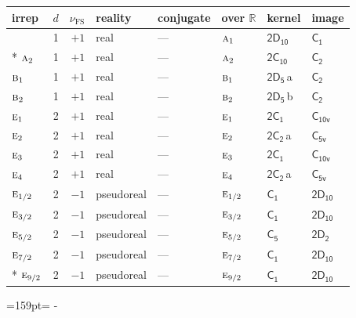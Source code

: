 \documentclass[10pt,a4paper]{article}
\makeatletter
\def\grouprule#1#2{\noalign{\marks\LTgroupmarks{\the\belowrulesep}\nobreak\vskip#1%
  \vskip\aboverulesep}\multispan\LT@cols\unskip{\leaders\hrule\@height#2\hfill\kern\z@}\cr
  \noalign{\penalty\LTrulebreak\vskip\belowrulesep\global\@lastruleclass\z@}}
\newcommand{\needspace}[1]{\par\penalty-100\begingroup\dimen0=#1\relax\dimen2=\pagegoal
  \advance\dimen2-\pagetotal\ifdim\dimen0>\dimen2\relax\ifdim\dimen2>0pt\vfil\break\fi\fi
  \endgroup}
\numberwithin{equation}{section}
\newcommand{\grp}[1]{\mathsf{#1}}
\newcommand{\irr}[1]{\text{\normalfont\scshape #1}}
\newcommand{\detbox}[1]{{\setlength{\fboxsep}{1pt}\fbox{#1}}}
\newcommand{\clsletter}[1]{\,{\scriptsize\color{black!55}#1}}
\newcommand{\fsind}{\nu_{\mathrm{FS}}}
\makeatother
\begin{document}
\setlength{\emergencystretch}{2em}\par\setlength{\emergencystretch}{0pt}
{\small\renewcommand{\arraystretch}{1.25}\setlength{\tabcolsep}{4pt}\begin{longtable}{@{}lrrlllll@{}}\toprule
irrep & $d$ & $\fsind$ & reality & conjugate & over $\mathbb{R}$ & kernel & image\\\midrule\endhead
\bottomrule\endfoot\endlastfoot
\detbox{$\irr{a}_{1}$} & 1 & $+1$ & real & --- & $\irr{a}_{1}$ & \href{2D10.pdf}{$\grp{2D_{10}}$} & \href{../../../rotation/data/pdf/C1.pdf}{$\grp{C_{1}}$}\\*
$\irr{a}_{2}$ & 1 & $+1$ & real & --- & $\irr{a}_{2}$ & \href{2C10.pdf}{$\grp{2C_{10}}$} & \href{../../../rotation/data/pdf/C2.pdf}{$\grp{C_{2}}$}\\
$\irr{b}_{1}$ & 1 & $+1$ & real & --- & $\irr{b}_{1}$ & \href{2D5.pdf}{$\grp{2D_{5}}$}\clsletter{a} & \href{../../../rotation/data/pdf/C2.pdf}{$\grp{C_{2}}$}\\
$\irr{b}_{2}$ & 1 & $+1$ & real & --- & $\irr{b}_{2}$ & \href{2D5.pdf}{$\grp{2D_{5}}$}\clsletter{b} & \href{../../../rotation/data/pdf/C2.pdf}{$\grp{C_{2}}$}\\
$\irr{e}_{1}$ & 2 & $+1$ & real & --- & $\irr{e}_{1}$ & \href{2C1.pdf}{$\grp{2C_{1}}$} & \href{../../../rotation/data/pdf/C10v.pdf}{$\grp{C_{10v}}$}\\
$\irr{e}_{2}$ & 2 & $+1$ & real & --- & $\irr{e}_{2}$ & \href{2C2.pdf}{$\grp{2C_{2}}$}\clsletter{a} & \href{../../../rotation/data/pdf/C5v.pdf}{$\grp{C_{5v}}$}\\
$\irr{e}_{3}$ & 2 & $+1$ & real & --- & $\irr{e}_{3}$ & \href{2C1.pdf}{$\grp{2C_{1}}$} & \href{../../../rotation/data/pdf/C10v.pdf}{$\grp{C_{10v}}$}\\
$\irr{e}_{4}$ & 2 & $+1$ & real & --- & $\irr{e}_{4}$ & \href{2C2.pdf}{$\grp{2C_{2}}$}\clsletter{a} & \href{../../../rotation/data/pdf/C5v.pdf}{$\grp{C_{5v}}$}\\
\grouprule{0pt}{\lightrulewidth}
$\irr{e}_{1/2}$ & 2 & $-1$ & pseudoreal & --- & $\irr{e}_{1/2}$ & \href{C1.pdf}{$\grp{C_{1}}$} & \href{2D10.pdf}{$\grp{2D_{10}}$}\\
$\irr{e}_{3/2}$ & 2 & $-1$ & pseudoreal & --- & $\irr{e}_{3/2}$ & \href{C1.pdf}{$\grp{C_{1}}$} & \href{2D10.pdf}{$\grp{2D_{10}}$}\\
$\irr{e}_{5/2}$ & 2 & $-1$ & pseudoreal & --- & $\irr{e}_{5/2}$ & \href{C5.pdf}{$\grp{C_{5}}$} & \href{2D2.pdf}{$\grp{2D_{2}}$}\\
$\irr{e}_{7/2}$ & 2 & $-1$ & pseudoreal & --- & $\irr{e}_{7/2}$ & \href{C1.pdf}{$\grp{C_{1}}$} & \href{2D10.pdf}{$\grp{2D_{10}}$}\\*
$\irr{e}_{9/2}$ & 2 & $-1$ & pseudoreal & --- & $\irr{e}_{9/2}$ & \href{C1.pdf}{$\grp{C_{1}}$} & \href{2D10.pdf}{$\grp{2D_{10}}$}\\
\bottomrule\end{longtable}}
\needspace{159pt}
\end{document}
